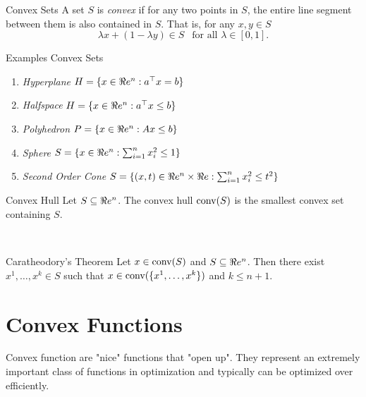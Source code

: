 \begin{definition}{Convex Sets}{}
A set $S$ is \emph{convex} if for any two points in $S$, the entire line segment between them is also contained in $S$.
That is, for any $x,y \in S$
$$
\lambda x + (1-\lambda y) \in S \ \ \text{ for all } \lambda \in [0,1].
$$
\end{definition}


    


Examples Convex Sets
\begin{enumerate}
    \item \emph{Hyperplane}  $H = \{x \in \Re e^n : a^\top x = b\}$
    \item \emph{Halfspace}   $H = \{ x \in \Re e^n : a^\top x \leq b\}$
    \item \emph{Polyhedron}  $P = \{x \in \Re e^n : Ax \leq b\}$
    \item \emph{Sphere} $S = \{ x \in \Re e^n : \sum_{i=1}^n x_i^2 \leq 1\}$
    \item \emph{Second Order Cone} $S = \{ (x,t) \in \Re e^n \times \Re e : \sum_{i=1}^n x_i^2 \leq t^2 \}$
\end{enumerate}





\begin{definition}{Convex Hull}{}
Let $S\subseteq \Re e^n$.  The convex hull $\textup{conv}(S)$ is the smallest convex set containing $S$.
\end{definition}

\begin{figure}[H]
\begin{center}
 \ \ 
\end{center}
\end{figure}
\begin{theorem}{Caratheodory's Theorem}{}
Let $x \in \textup{conv}(S)$ and $S \subseteq \Re e^n$.  Then there exist $x^1, \dots, x^k \in S$ such that $x \in \textup{conv}(\{x^1, \dots, x^k\})$ and $k \leq n+1$.
\end{theorem}




\section{Convex Functions}


Convex function are "nice" functions that "open up".  They represent an extremely important class of functions in optimization and typically can be optimized over efficiently.


